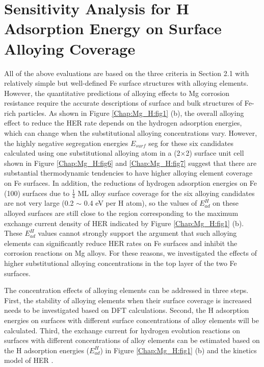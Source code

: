 \section{Sensitivity Analysis for H Adsorption Energy on Surface Alloying Coverage}

All of the above evaluations are based on the three criteria in Section 2.1 with relatively simple but well-defined Fe surface structures with alloying elements. However, the quantitative predictions of alloying effects to Mg corrosion resistance require the accurate descriptions of surface and bulk structures of Fe-rich particles. As shown in Figure \ref{Chap:Mg_H:fig1} (b), the overall alloying effect to reduce the \ac{HER} rate depends on the hydrogen adsorption energies, which can change when the substitutional alloying concentrations vary. However, the highly negative segregation energies $E_{surf}$ seg for these six candidates calculated using one substitutional alloying atom in a (2$\times$2) surface unit cell shown in Figure \ref{Chap:Mg_H:fig6} and \ref{Chap:Mg_H:fig7} suggest that there are substantial thermodynamic tendencies to have higher alloying element coverage on Fe surfaces. In addition, the reductions of hydrogen adsorption energies on Fe (100) surfaces due to $\frac{1}{4}$ \ac{ML} alloy surface coverage for the six alloying candidates are not very large (0.2 $\sim$ 0.4 eV per H atom), so the values of $E_{ad}^H$  on these alloyed surfaces are still close to the region corresponding to the maximum exchange current density of HER indicated by Figure \ref{Chap:Mg_H:fig1} (b). These $E_{ad}^H$ values cannot strongly support the argument that such alloying elements can significantly reduce HER rates on Fe surfaces and inhibit the corrosion reactions on Mg alloys. For these reasons, we investigated the effects of higher substitutional alloying concentrations in the top layer of the two Fe surfaces.


The concentration effects of alloying elements can be addressed in three steps. First, the stability of alloying elements when their surface coverage is increased needs to be investigated based on DFT calculations. Second, the H adsorption energies on surfaces with different surface concentrations of alloy elements will be calculated. Third, the exchange current for hydrogen evolution reactions on surfaces with different concentrations of alloy elements can be estimated based on the H adsorption energies ($E_{ad}^H$) in Figure \ref{Chap:Mg_H:fig1} (b) and the kinetics model of \ac{HER} \cite{greeley2006computational, norskov2005trends}.


